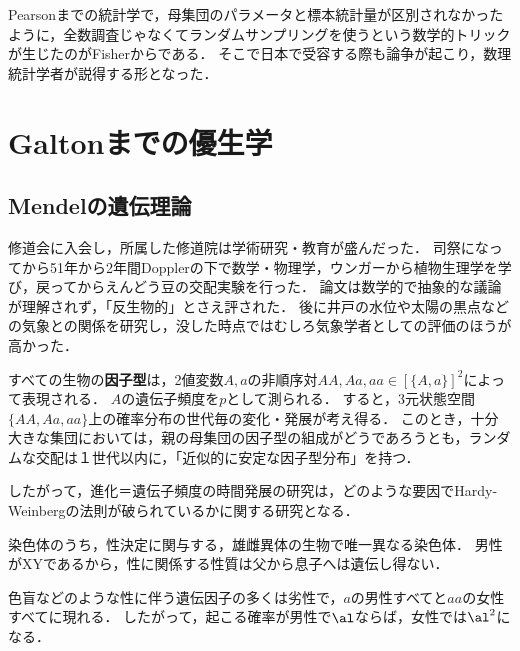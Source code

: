 \documentclass[uplatex,dvipdfmx]{jsreport}
\begin{document}
\begin{history}[日本での受容]
    Pearsonまでの統計学で，母集団のパラメータと標本統計量が区別されなかったように，全数調査じゃなくてランダムサンプリングを使うという数学的トリックが生じたのがFisherからである．
    そこで日本で受容する際も論争が起こり，数理統計学者が説得する形となった．
\end{history}

\section{Galtonまでの優生学}

\subsection{Mendelの遺伝理論}

\begin{history}
    修道会に入会し，所属した修道院は学術研究・教育が盛んだった．
    司祭になってから51年から2年間Dopplerの下で数学・物理学，ウンガーから植物生理学を学び，戻ってからえんどう豆の交配実験を行った．
    論文\cite{Mendel66}は数学的で抽象的な議論が理解されず，「反生物的」とさえ評された．
    後に井戸の水位や太陽の黒点などの気象との関係を研究し，没した時点ではむしろ気象学者としての評価のほうが高かった．
\end{history}

\begin{theory}
    すべての生物の\textbf{因子型}は，2値変数$A,a$の非順序対$AA,Aa,aa\in[\{A,a\}]^2$によって表現される．
    $A$の遺伝子頻度を$p$として測られる．
    すると，3元状態空間$\{AA,Aa,aa\}$上の確率分布の世代毎の変化・発展が考え得る．
    このとき，十分大きな集団においては，親の母集団の因子型の組成がどうであろうとも，ランダムな交配は１世代以内に，「近似的に安定な因子型分布」を持つ\cite{Hardy08}．
\end{theory}
\begin{remarks}
    したがって，進化＝遺伝子頻度の時間発展の研究は，どのような要因でHardy-Weinbergの法則が破られているかに関する研究となる．
\end{remarks}

\begin{theory}[性染色体]
    染色体のうち，性決定に関与する，雄雌異体の生物で唯一異なる染色体．
    男性がXYであるから，性に関係する性質は父から息子へは遺伝し得ない．

    色盲などのような性に伴う遺伝因子の多くは劣性で，$a$の男性すべてと$aa$の女性すべてに現れる．
    したがって，起こる確率が男性で$\al$ならば，女性では$\al^2$になる．
\end{theory}
\end{document}
